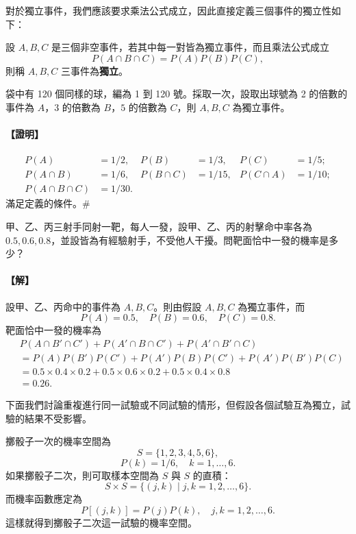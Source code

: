 對於獨立事件，我們應該要求乘法公式成立，因此直接定義三個事件的獨立性如下：

\medskip
\begin{definition*}
設 $A, B, C$ 是三個非空事件，若其中每一對皆為獨立事件，而且乘法公式成立
\[
P(A \cap B \cap C) = P(A)P(B)P(C),
\]
則稱 $A, B, C$ 三事件為\textbf{獨立}。
\end{definition*}

\medskip
\begin{example}\label{ex:b5-4-14}
袋中有 120 個同樣的球，編為 1 到 120 號。採取一次，設取出球號為 2 的倍數的事件為 $A$，$3$ 的倍數為 $B$，$5$ 的倍數為 $C$，則 $A, B, C$ 為獨立事件。
\end{example}
\paragraph{【證明】}
\begin{align*}
P(A) &= 1/2, & P(B) &= 1/3, & P(C) &= 1/5; \\
P(A \cap B) &= 1/6, & P(B \cap C) &= 1/15, & P(C \cap A) &= 1/10; \\
P(A \cap B \cap C) &= 1/30.
\end{align*}
滿足定義的條件。\hfill\#

\medskip
\begin{example}\label{ex:b5-4-15}
甲、乙、丙三射手同射一靶，每人一發，設甲、乙、丙的射擊命中率各為 $0.5, 0.6, 0.8$，並設皆為有經驗射手，不受他人干擾。問靶面恰中一發的機率是多少？
\end{example}
\paragraph{【解】}
設甲、乙、丙命中的事件為 $A, B, C$。則由假設 $A, B, C$ 為獨立事件，而
\[
P(A) = 0.5, \quad P(B) = 0.6, \quad P(C) = 0.8.
\]
靶面恰中一發的機率為
\begin{align*}
& P(A \cap B' \cap C') + P(A' \cap B \cap C') + P(A' \cap B' \cap C) \\
&= P(A)P(B')P(C') + P(A')P(B)P(C') + P(A')P(B')P(C) \\
&= 0.5 \times 0.4 \times 0.2 + 0.5 \times 0.6 \times 0.2 + 0.5 \times 0.4 \times 0.8 \\
&= 0.26. \tag*{\#}
\end{align*}

下面我們討論重複進行同一試驗或不同試驗的情形，但假設各個試驗互為獨立，試驗的結果不受影響。

擲骰子一次的機率空間為
\[
S = \{1, 2, 3, 4, 5, 6\},
\]
\[
P(k) = 1/6, \quad k = 1, \dots, 6.
\]
如果擲骰子二次，則可取樣本空間為 $S$ 與 $S$ 的直積：
\[
S \times S = \{(j, k) \mid j, k = 1, 2, \dots, 6\}.
\]
而機率函數應定為
\[
P[(j, k)] = P(j)P(k), \quad j, k = 1, 2, \dots, 6.
\]
這樣就得到擲骰子二次這一試驗的機率空間。

